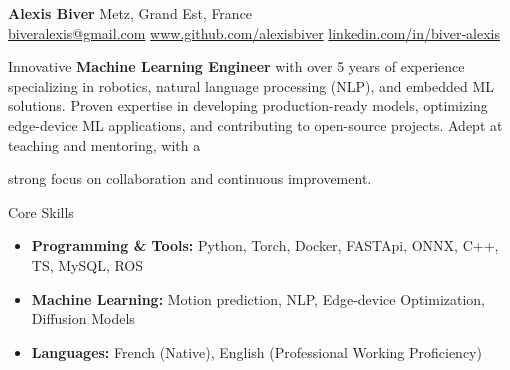 \documentclass{resume} %
\begin{document}
\begin{center}
    {\Huge \textbf{Alexis Biver}} \hspace{5cm} Metz, Grand Est, France \\
    \href{mailto:biveralexis@gmail.com}{biveralexis@gmail.com}   \hspace{1cm}     \href{https://github.com/alexisbiver}{www.github.com/alexisbiver}  \hspace{1cm} \href{https://linkedin.com/in/biver-alexis}{linkedin.com/in/biver-alexis}
\end{center}

\vspace{0.3cm}

Innovative \textbf{Machine Learning Engineer} with over 5 years of experience specializing in robotics, natural language processing (NLP), and embedded ML solutions. Proven expertise in developing production-ready models, optimizing edge-device ML applications, and contributing to open-source projects. Adept at teaching and mentoring, with a 
\centerline {strong focus on collaboration and continuous improvement.}

 \begin{rSection}{Core Skills}
\begin{itemize}
    \item \textbf{Programming \& Tools:} Python, Torch, Docker, FASTApi, ONNX, C++, TS, MySQL, ROS
    \item \textbf{Machine Learning:} Motion prediction, NLP, Edge-device Optimization, Diffusion Models
    \item \textbf{Languages:} French (Native), English (Professional Working Proficiency)
\end{itemize}
\end{rSection} 
\end{document}
